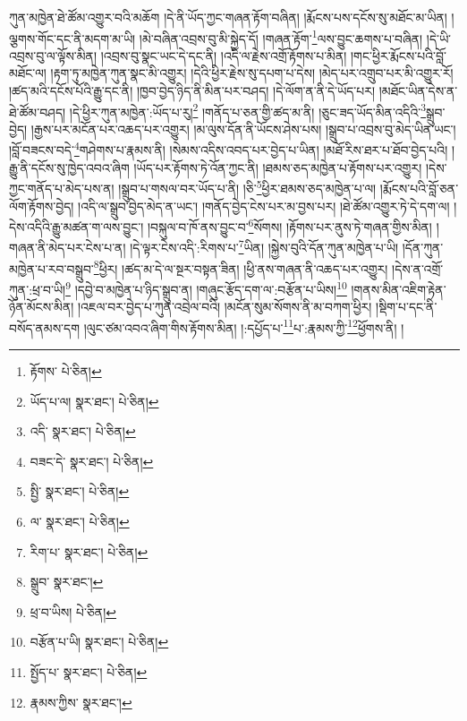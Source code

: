 ཀུན་མཁྱེན་ཐེ་ཚོམ་འགྱུར་བའི་མཆོག །དེ་ནི་ཡོད་ཀྱང་གཞན་རྟོག་བཞིན། །རྨོངས་པས་དངོས་སུ་མཐོང་མ་ཡིན། །ལྕགས་གོང་དང་ནི་མདག་མ་ཡི། །མེ་བཞིན་འབྲས་བུ་མི་སྐྱེད་དོ། །གཞན་རྟོག་\footnote{རྟོགས་  པེ་ཅིན། }ལས་བྱུང་ཆགས་པ་བཞིན། །དེ་ཡི་འབྲས་བུ་ལ་ལྟོས་མིན། །འབྲས་བུ་སྣང་ཡང་དེ་དང་ནི། །འདི་ལ་རྗེས་འགྲོ་རྟོགས་པ་མིན། །གང་ཕྱིར་རྨོངས་པའི་བློ་མཐོང་ལ། །རྟག་ཏུ་མཁྱེན་ཀུན་སྣང་མི་འགྱུར། །དེའི་ཕྱིར་རྗེས་སུ་དཔག་པ་དེས། །མེད་པར་འགྲུབ་པར་མི་འགྱུར་རོ། །ཚད་མའི་དངོས་པོའི་རྒྱུ་དང་ནི། །ཁྱབ་བྱེད་ཉིད་ནི་མིན་པར་བཤད། །དེ་ལོག་ན་ནི་དེ་ཡོད་པར། །མཐོང་ཡིན་དེས་ན་ཐེ་ཚོམ་བཤད། །དེ་ཕྱིར་ཀུན་མཁྱེན་:ཡོད་པ་རུ།\footnote{ཡོད་པ་ལ།  སྣར་ཐང་།  པེ་ཅིན། } །གནོད་པ་ཅན་གྱི་ཚད་མ་ནི། །ཅུང་ཟད་ཡོད་མིན་འདིའི་\footnote{འདི་  སྣར་ཐང་།  པེ་ཅིན། }སྒྲུབ་བྱེད། །རྒྱས་པར་མངོན་པར་འཆད་པར་འགྱུར། །མ་ལུས་དོན་ནི་ཡོངས་ཤེས་པས། །སྒྲུབ་པ་འབྲས་བུ་མེད་ཡིན་ཡང་། །བློ་བཟངས་བདེ་\footnote{བཟང་དེ་  སྣར་ཐང་།  པེ་ཅིན། }གཤེགས་པ་རྣམས་ནི། །སེམས་འདིས་འབད་པར་བྱེད་པ་ཡིན། །མཐོ་རིས་ཐར་པ་ཐོབ་བྱེད་པའི། །རྒྱུ་ནི་དངོས་སུ་ཁྱེད་འབའ་ཞིག །ཡོད་པར་རྟོགས་ཏེ་འོན་ཀྱང་ནི། །ཐམས་ཅད་མཁྱེན་པ་རྟོགས་པར་འགྱུར། །དེས་ཀྱང་གནོད་པ་མེད་པས་ན། །སྒྲུབ་པ་གསལ་བར་ཡོད་པ་ནི། །ཅི་\footnote{སྤྱི་  སྣར་ཐང་།  པེ་ཅིན། }ཕྱིར་ཐམས་ཅད་མཁྱེན་པ་ལ། །རྨོངས་པའི་བློ་ཅན་ལོག་རྟོགས་བྱེད། །འདི་ལ་སྒྲུབ་བྱེད་མེད་ན་ཡང་། །གནོད་བྱེད་ངེས་པར་མ་བྱས་པར། །ཐེ་ཚོམ་འགྱུར་ཏེ་དེ་དག་ལ། །དེས་འདིའི་རྒྱུ་མཚན་ག་ལས་བྱུང་། །བསྐུལ་བ་ཁོ་ནས་བྱུང་བ་\footnote{ལ་  སྣར་ཐང་།  པེ་ཅིན། }སོགས། །རྟོགས་པར་ནུས་ཏེ་གཞན་གྱིས་མིན། །གཞན་ནི་མེད་པར་ངེས་པ་ན། །དེ་ལྟར་ངེས་འདི་:རིགས་པ་\footnote{རིག་པ་  སྣར་ཐང་།  པེ་ཅིན། }ཡིན། །སྐྱེས་བུའི་དོན་ཀུན་མཁྱེན་པ་ཡི། །དོན་ཀུན་མཁྱེན་པ་རབ་བསྒྲུབ་\footnote{སྒྲུབ་  སྣར་ཐང་། }ཕྱིར། །ཚད་མ་དེ་ལ་སྔར་བསྟན་ཟིན། །ཕྱི་ནས་གཞན་ནི་འཆད་པར་འགྱུར། །དེས་ན་འགྲོ་ཀུན་:ཕྲ་བ་ཡི།\footnote{ཕྲ་བ་ཡིས།  པེ་ཅིན། } །དབྱེ་བ་མཁྱེན་པ་ཉིད་སྒྲུབ་ན། །གཞུང་རྩོད་དག་ལ་:བརྩོན་པ་ཡིས།\footnote{བརྩོན་པ་ཡི།  སྣར་ཐང་།  པེ་ཅིན། } །གནས་མིན་འཇིག་རྟེན་ཉོན་མོངས་མིན། །འཇལ་བར་བྱེད་པ་ཀུན་འབྲེལ་བའི། །མངོན་སུམ་སོགས་ནི་མ་བཀག་ཕྱིར། །སྡིག་པ་དང་ནི་བསོད་ནམས་དག །ལུང་ཙམ་འབའ་ཞིག་གིས་རྟོགས་མིན། །:དཔྱོད་པ་\footnote{སྤྱོད་པ་  སྣར་ཐང་།  པེ་ཅིན། }པ་:རྣམས་ཀྱི་\footnote{རྣམས་ཀྱིས་  སྣར་ཐང་། }ཕྱོགས་ནི། །
